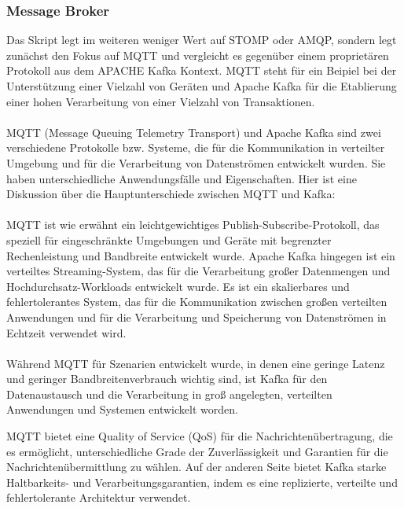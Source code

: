 \documentclass[../vs-script-first-v01.tex]{subfiles}
\begin{document}
\subsubsection{Message Broker}
Das Skript legt im weiteren weniger Wert auf STOMP oder AMQP, sondern legt zunächst den Fokus auf MQTT und vergleicht es gegenüber einem proprietären Protokoll aus dem APACHE Kafka Kontext. MQTT steht für ein Beipiel bei der Unterstützung einer Vielzahl von Geräten und Apache Kafka für die Etablierung einer hohen Verarbeitung von einer Vielzahl von Transaktionen.
\\\\
MQTT (Message Queuing Telemetry Transport) und Apache Kafka sind zwei verschiedene Protokolle bzw. Systeme, die für die Kommunikation in verteilter Umgebung und für die Verarbeitung von Datenströmen entwickelt wurden. Sie haben unterschiedliche Anwendungsfälle und Eigenschaften. Hier ist eine Diskussion über die Hauptunterschiede zwischen MQTT und Kafka:
\\\\
MQTT ist wie erwähnt ein leichtgewichtiges Publish-Subscribe-Protokoll, das speziell für eingeschränkte Umgebungen und Geräte mit begrenzter Rechenleistung und Bandbreite entwickelt wurde. Apache Kafka hingegen ist ein verteiltes Streaming-System, das für die Verarbeitung großer Datenmengen und Hochdurchsatz-Workloads entwickelt wurde. Es ist ein skalierbares und fehlertolerantes System, das für die Kommunikation zwischen großen verteilten Anwendungen und für die Verarbeitung und Speicherung von Datenströmen in Echtzeit verwendet wird.
\\\\
Während MQTT für Szenarien entwickelt wurde, in denen eine geringe Latenz und geringer Bandbreitenverbrauch wichtig sind, ist Kafka für den Datenaustausch und die Verarbeitung in groß angelegten, verteilten Anwendungen und Systemen entwickelt worden.

MQTT bietet eine Quality of Service (QoS) für die Nachrichtenübertragung, die es ermöglicht, unterschiedliche Grade der Zuverlässigkeit und Garantien für die Nachrichtenübermittlung zu wählen. Auf der anderen Seite bietet Kafka starke Haltbarkeits- und Verarbeitungsgarantien, indem es eine replizierte, verteilte und fehlertolerante Architektur verwendet.
\end{document}
